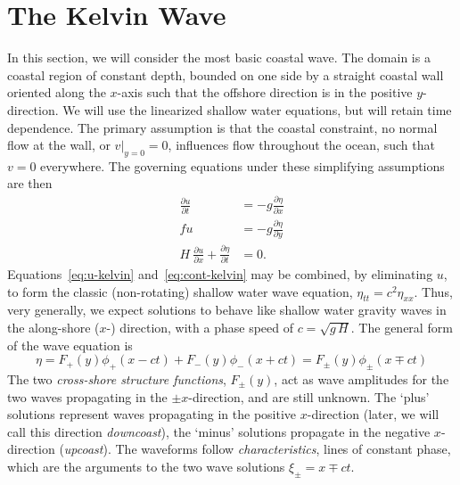 \documentclass[11pt]{report}
\numberwithin{equation}{section}
\begin{document}
\section{The Kelvin Wave}

In this section, we will consider the most basic coastal wave.  The domain is a coastal region of constant depth, bounded on one side by a straight coastal wall oriented along the $x$-axis such that the offshore direction is in the positive $y$-direction.  We will use the linearized shallow water equations, but will retain time dependence.  The primary assumption is that the coastal constraint, no normal flow at the wall, or $v|_{y=0} = 0$, influences flow throughout the ocean, such that $v=0$ everywhere.  The governing equations under these simplifying assumptions are then
\begin{align}
    \frac{\partial u}{\partial t} &= -g\frac{\partial \eta}{\partial x} \label{eq:u-kelvin} \\
    f u &= -g\frac{\partial \eta}{\partial y}  \label{eq:v-kelvin} \\
    H\ \frac{\partial u}{\partial x} + \frac{\partial \eta}{\partial t} &= 0. \label{eq:cont-kelvin}
\end{align}
Equations~\ref{eq:u-kelvin} and~\ref{eq:cont-kelvin} may be combined, by eliminating $u$, to form the classic (non-rotating) shallow water wave equation, $\eta_{tt} = c^2 \eta_{xx}$.  Thus, very generally, we expect solutions to behave like shallow water gravity waves in the along-shore ($x$-) direction, with a phase speed of $c=\sqrt{g\,H}$.  The general form of the wave equation is
\begin{equation}
    \label{eq:wave-solution-kelvin}
    \eta = F_+(y) \phi_+(x - c t) + F_-(y) \phi_-(x + c t) = F_\pm(y) \phi_\pm(x \mp c t)
\end{equation}
The two {\it cross-shore structure functions}, $F_\pm(y)$, act as wave amplitudes for the two waves propagating in the $\pm x$-direction, and are still unknown.  The `plus' solutions represent waves propagating in the positive $x$-direction (later, we will call this direction {\it downcoast}), the `minus' solutions propagate in the negative $x$-direction ({\it upcoast}).  The waveforms follow {\it characteristics}, lines of constant phase, which are the arguments to the two wave solutions $\xi_\pm = x \mp c t$.
\end{document}
